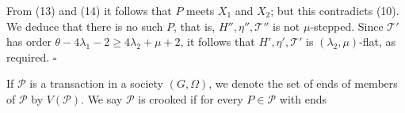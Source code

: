 From (13) and (14) it follows that $P$ meets $X_1$ and $X_2$; but this contradicts (10). We deduce that there is no such $P$, that is, $H'', \eta'', \mathcal{T}''$ is not $\mu$-stepped. Since $\mathcal{T}'$ has order $\theta - 4\lambda_1 - 2 \ge 4\lambda_2 + \mu + 2$, it follows that $H', \eta', \mathcal{T}'$ is $(\lambda_2, \mu)$-flat, as required. $\square$


If $\mathcal{P}$ is a transaction in a society $(G, \Omega)$, we denote the set of ends of members of $\mathcal{P}$ by $V(\mathcal{P})$. We say $\mathcal{P}$ is crooked if for every $P \in \mathcal{P}$ with ends
